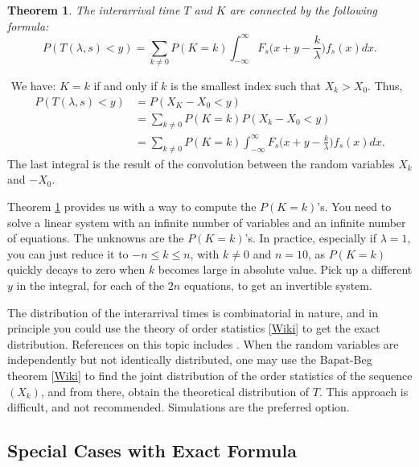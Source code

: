 \documentclass[10pt]{article}
\newtheorem{theorem}{Theorem}[section]
\newenvironment{proof}[1][Proof]{\begin{trivlist}
\item[\hskip \labelsep {\bfseries #1}]}{\end{trivlist}}
\newcommand{\qed}{\nobreak \ifvmode \relax \else
      \ifdim\lastskip<1.5em \hskip-\lastskip
      \hskip1.5em plus0em minus0.5em \fi \nobreak
      \vrule height0.75em width0.5em depth0.25em\fi}
\begin{document}
\begin{theorem}
\label{sums5}
The interarrival time $T$ and $K$ are connected by the following formula:
$$P(T(\lambda,s)<y)=\sum_{k\neq 0} P(K=k)\int_{-\infty}^\infty F_s\Big(x+y-\frac{k}{\lambda}\Big)f_s(x)dx.$$
 \end{theorem}
\begin{proof}
$ $ \newline 
We have: $K=k$ if and only if $k$ is the smallest index such that $X_k>X_0$. Thus,
\begin{align}
P(T(\lambda,s)<y) & = P(X_K-X_0<y)\nonumber\\
  &=\sum_{k\neq 0} P(K=k)P(X_k-X_0<y) \nonumber \\
  &= \sum_{k\neq 0} P(K=k)\int_{-\infty}^\infty F_s\Big(x+y-\frac{k}{\lambda}\Big)f_s(x)dx. \nonumber
\end{align}
The last integral is the result of the convolution between the random variables $X_k$ and $-X_0$.
\qed
\end{proof}

Theorem \ref{sums5} provides us with a way to compute the $P(K=k)$'s. You need to solve a linear system with an infinite number of variables and an infinite number of equations. The unknowns are the $P(K=k)$'s. In practice, especially if $\lambda=1$, you can just reduce it to $-n\leq k \leq n$, with $k\neq 0$ and $n=10$, as $P(K=k)$ quickly decays to zero when $k$ becomes large in absolute value. Pick up a different $y$ in the integral, for each of the $2n$ equations, to get an invertible system. 

The distribution of the interarrival times is combinatorial in nature, and in principle you could use the theory of \textcolor{index}{order statistics} [\href{https://en.wikipedia.org/wiki/Order_statistic}{Wiki}]
to get the exact distribution. References on this topic includes \cite{order2,order3}. When the random variables are independently but not identically distributed, 
one may use the Bapat-Beg theorem [\href{https://bit.ly/3oOqd7j}{Wiki}] to find the joint distribution of the order statistics of the sequence $(X_k)$, and from there, obtain the theoretical distribution of $T$. This approach is difficult, and not recommended. Simulations are the preferred option.

\subsection{Special Cases with Exact Formula}
\end{document}
